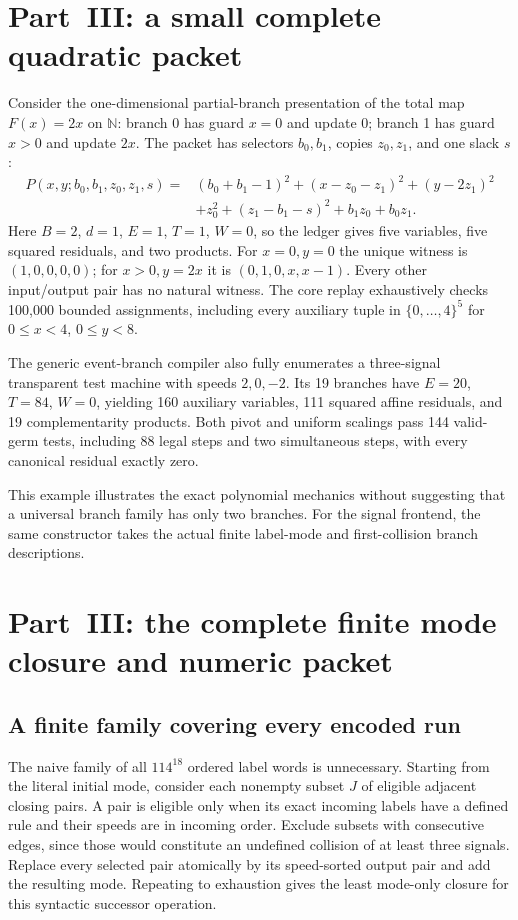 \documentclass[11pt,letterpaper]{article}
\numberwithin{equation}{section}
\theoremstyle{definition}
\theoremstyle{remark}
\newcommand{\NN}{\mathbb N}
\begin{document}
\section{Part~III: a small complete quadratic packet}\label{smc:cs:app:example}
Consider the one-dimensional partial-branch presentation of the total map $F(x)=2x$ on $\NN$: branch 0 has guard $x=0$ and update 0; branch 1 has guard $x>0$ and update $2x$. The packet has selectors $b_0,b_1$, copies $z_0,z_1$, and one slack $s$:
\begin{align*}
 P(x,y;b_0,b_1,z_0,z_1,s)
 ={}&(b_0+b_1-1)^2+(x-z_0-z_1)^2+(y-2z_1)^2\\
   &+z_0^2+(z_1-b_1-s)^2+b_1z_0+b_0z_1.
\end{align*}
Here $B=2$, $d=1$, $E=1$, $T=1$, $W=0$, so the ledger gives five variables, five squared residuals, and two products. For $x=0,y=0$ the unique witness is $(1,0,0,0,0)$; for $x>0,y=2x$ it is $(0,1,0,x,x-1)$. Every other input/output pair has no natural witness. The core replay exhaustively checks 100,000 bounded assignments, including every auxiliary tuple in $\{0,\ldots,4\}^5$ for $0\le x<4$, $0\le y<8$.

The generic event-branch compiler also fully enumerates a three-signal transparent test machine with speeds $2,0,-2$. Its 19 branches have $E=20$, $T=84$, $W=0$, yielding 160 auxiliary variables, 111 squared affine residuals, and 19 complementarity products. Both pivot and uniform scalings pass 144 valid-germ tests, including 88 legal steps and two simultaneous steps, with every canonical residual exactly zero.

This example illustrates the exact polynomial mechanics without suggesting that a universal branch family has only two branches. For the signal frontend, the same constructor takes the actual finite label-mode and first-collision branch descriptions.

\section{Part~III: the complete finite mode closure and numeric packet}\label{smc:cs:app:closure}
\subsection{A finite family covering every encoded run}
The naive family of all $114^{18}$ ordered label words is unnecessary. Starting from the literal initial mode, consider each nonempty subset $J$ of eligible adjacent closing pairs. A pair is eligible only when its exact incoming labels have a defined rule and their speeds are in incoming order. Exclude subsets with consecutive edges, since those would constitute an undefined collision of at least three signals. Replace every selected pair atomically by its speed-sorted output pair and add the resulting mode. Repeating to exhaustion gives the least mode-only closure for this syntactic successor operation.
\end{document}
